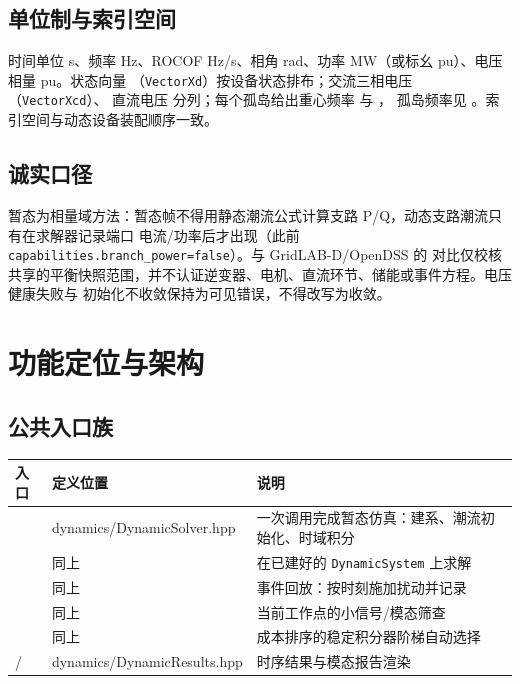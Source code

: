 \documentclass[UTF8,fontset=fandol,a4paper,11pt]{ctexart}
\begin{document}
\subsection{单位制与索引空间}
时间单位 s、频率 Hz、ROCOF Hz/s、相角 rad、功率 MW（或标幺 pu）、电压相量 pu。状态向量
（\texttt{VectorXd}）按设备状态排布；交流三相电压 （\texttt{VectorXcd}）、
直流电压  分列；每个孤岛给出重心频率  与 ，
孤岛频率见 。索引空间与动态设备装配顺序一致。

\subsection{诚实口径}
暂态为相量域方法：暂态帧不得用静态潮流公式计算支路 P/Q，动态支路潮流只有在求解器记录端口
电流/功率后才出现（此前 \texttt{capabilities.branch\_power=false}）。与 GridLAB-D/OpenDSS 的
对比仅校核共享的平衡快照范围，并不认证逆变器、电机、直流环节、储能或事件方程。电压健康失败与
初始化不收敛保持为可见错误，不得改写为收敛。

\section{功能定位与架构}
\subsection{公共入口族}
\begin{center}\footnotesize
\begin{tabular}{@{}L{6.6cm}L{3.0cm}L{5.4cm}@{}}
\toprule
入口 & 定义位置 & 说明\\
\midrule
{} & dynamics/DynamicSolver.hpp & 一次调用完成暂态仿真：建系、潮流初始化、时域积分\\
 & 同上 & 在已建好的 \texttt{DynamicSystem} 上求解\\
 & 同上 & 事件回放：按时刻施加扰动并记录\\
 & 同上 & 当前工作点的小信号/模态筛查\\
 & 同上 & 成本排序的稳定积分器阶梯自动选择\\
 /  & dynamics/DynamicResults.hpp & 时序结果与模态报告渲染\\
\bottomrule
\end{tabular}
\end{center}
\end{document}
